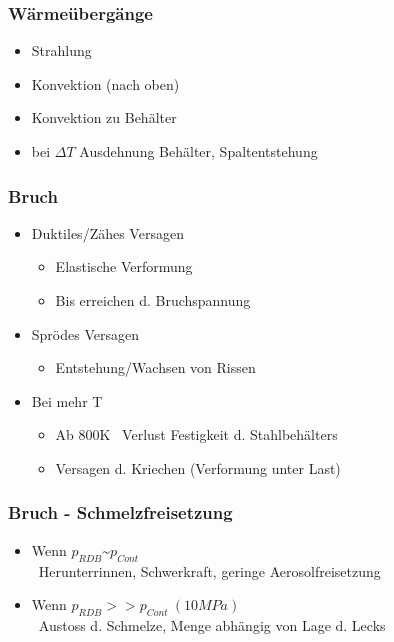 \documentclass[12pt]{article}
\begin{document}
\subsubsection{Wärmeübergänge}
\begin{itemize}
  \item Strahlung
  \item Konvektion (nach oben)
  \item Konvektion zu Behälter
  \item bei \(\Delta T\) Ausdehnung Behälter, Spaltentstehung
\end{itemize}

\subsubsection{Bruch}
\begin{itemize}
  \item Duktiles/Zähes Versagen
  \begin{itemize}
    \item Elastische Verformung
    \item Bis erreichen d. Bruchspannung
  \end{itemize}
  \item Sprödes Versagen
  \begin{itemize}
    \item Entstehung/Wachsen von Rissen
  \end{itemize}
  \item Bei mehr T
  \begin{itemize}
    \item Ab 800K \textrightarrow\ Verlust Festigkeit d. Stahlbehälters
    \item Versagen d. Kriechen (Verformung unter Last)
  \end{itemize}
\end{itemize}

\subsubsection{Bruch - Schmelzfreisetzung}
\begin{itemize}
  \item Wenn \(p_{RDB} \text{\textasciitilde} p_{Cont}\)\\
  \textrightarrow\ Herunterrinnen, Schwerkraft, geringe Aerosolfreisetzung
  \item Wenn \(p_{RDB} >> p_{Cont}\ (10MPa)\)\\
  \textrightarrow\ Austoss d. Schmelze, Menge abhängig von Lage d. Lecks
\end{itemize}
\end{document}
